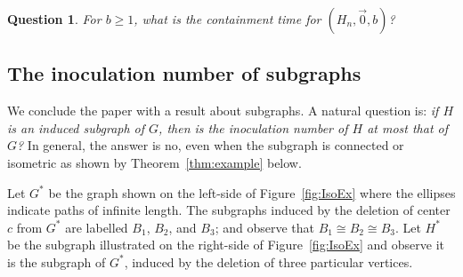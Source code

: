 \documentclass[unknownkeysallowed]{article}
\newtheorem{ques}[theorem]{Question}
\theoremstyle{definition}\newtheorem{strategy}{Strategy}
\theoremstyle{definition}\newtheorem{notation}{Notation}[theorem]
\begin{document}
\begin{ques}For $b\geq 1$, what is the containment time for $(H_n,\vec{0},b)$?
\end{ques}





\subsection{The inoculation number of subgraphs}\label{sec:subgraphs}

We conclude the paper with a result about subgraphs. A natural question is:  {\it if $H$ is an induced subgraph of $G$, then is the inoculation number of $H$ at most that of $G$?}  In general, the answer is no, even when the subgraph is connected or isometric as shown by Theorem~\ref{thm:example} below.

Let $G^*$ be the graph shown on the left-side of Figure~\ref{fig:IsoEx} where the ellipses indicate paths of infinite length. The subgraphs induced by the deletion of center $c$ from $G^*$ are labelled $B_1$, $B_2$, and $B_3$; and observe that $B_1 \cong B_2 \cong B_3$.  Let $H^*$ be the subgraph illustrated on the right-side of Figure~\ref{fig:IsoEx} and observe it is the subgraph of $G^*$, induced by the deletion of three particular vertices.  
\end{document}
